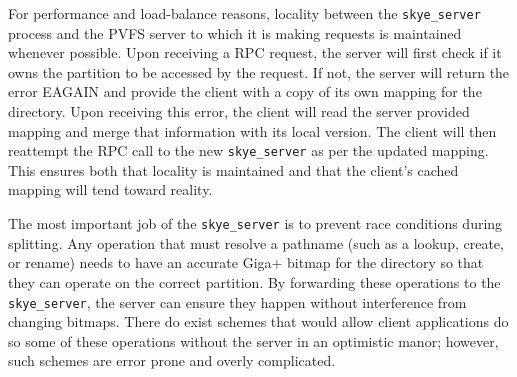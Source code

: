 \documentclass[twocolumn,letterpaper]{article}
\newcommand{\code}[1]{\texttt{#1}}
\begin{document}
For performance and load-balance reasons, locality between the
\code{skye\_\-server} process and the PVFS server to which it is making
requests is maintained whenever possible.  Upon receiving a RPC request, the
server will first check if it owns the partition to be accessed by the
request.  If not, the server will return the error EAGAIN and provide
the client with a copy of its own mapping for the directory.  Upon receiving
this error, the client will read the server provided mapping and merge that
information with its local version.  The client will then reattempt the RPC
call to the new \code{skye\_\-server} as per the updated mapping.  This
ensures both that locality is maintained and that the client's cached mapping
will tend toward reality.

The most important job of the \code{skye\_server} is to prevent race
conditions during splitting.  Any operation that must resolve a pathname (such
as a lookup, create, or rename) needs to have an accurate Giga+ bitmap for the
directory so that they can operate on the correct partition.  By forwarding
these operations to the \code{skye\_server}, the server can ensure they happen
without interference from changing bitmaps.  There do exist schemes that would
allow client applications do so some of these operations without the server in
an optimistic manor; however, such schemes are error prone and overly
complicated.
\end{document}
